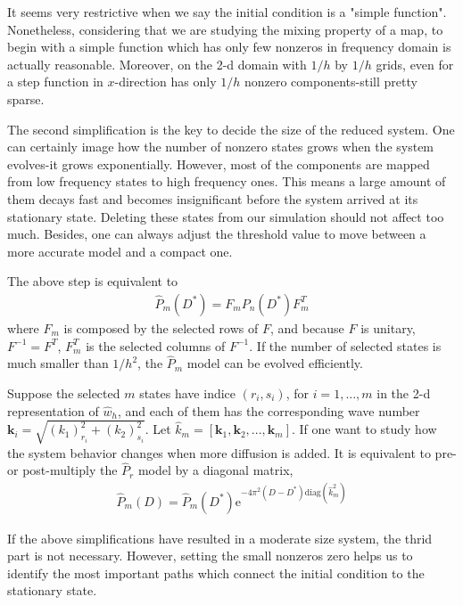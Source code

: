 \documentclass{article}
\begin{document}
It seems very restrictive when we say the initial condition is a
"simple function". Nonetheless, considering that we are studying the
mixing property of a map, to begin with a simple function which has
only few nonzeros in frequency domain is actually reasonable.
Moreover, on the 2-d domain with $1/h$ by $1/h$ grids, even for a step
function in $x$-direction has only $1/h$ nonzero components-still
pretty sparse.

The second simplification is the key to decide the size of the
reduced system. One can certainly image how the number of nonzero
states grows when the system evolves-it grows exponentially.
However, most of the components are mapped from low frequency states
to high frequency ones. This means a large amount of them decays
fast and becomes insignificant before the system arrived at its
stationary state. Deleting these states from our simulation should
not affect too much. Besides, one can always adjust the threshold
value to move between a more accurate model and a compact one.

The above step is equivalent to
\begin{eqnarray}
\label{Prmodel}
    \hat{P}_m(D^*) = F_m P_n(D^*) F_m^T
\end{eqnarray}
where $F_m$ is composed by the selected rows of $F$, and because $F$ is unitary, $F^{-1} = F^T$,
$F_m^T$ is the selected columns of $F^{-1}$. If the number of selected states is much smaller than
$1/h^2$, the $\hat{P}_m$ model can be evolved efficiently.

Suppose the selected $m$ states have indice $(r_i,s_i)$, for $i=1,...,m$
in the 2-d representation of $\hat{w}_h$, and each of them has the
corresponding wave number $\mathbf{k}_i = \sqrt{(k_1)_{r_i}^2+(k_2)_{s_i}^2}$.
Let $\hat{k}_m = [\mathbf{k}_1, \mathbf{k}_2,...,\mathbf{k}_m ]$.
If one want to study how the system behavior changes when more diffusion is added.
It is equivalent to pre- or post-multiply the $\hat{P}_r$ model by a diagonal matrix,
\begin{eqnarray}
\label{PraddDiffusion}
    \hat{P}_m(D) = \hat{P}_m(D^*)\text{e}^{-4 \pi^2 (D-D^*) \text{diag}(\hat{k}_m^2)}
\end{eqnarray}

If the above simplifications have resulted in a moderate size system,
the thrid part is not necessary. However, setting the small nonzeros
zero helps us to identify the most important paths which connect the
initial condition to the stationary state.
\end{document}
